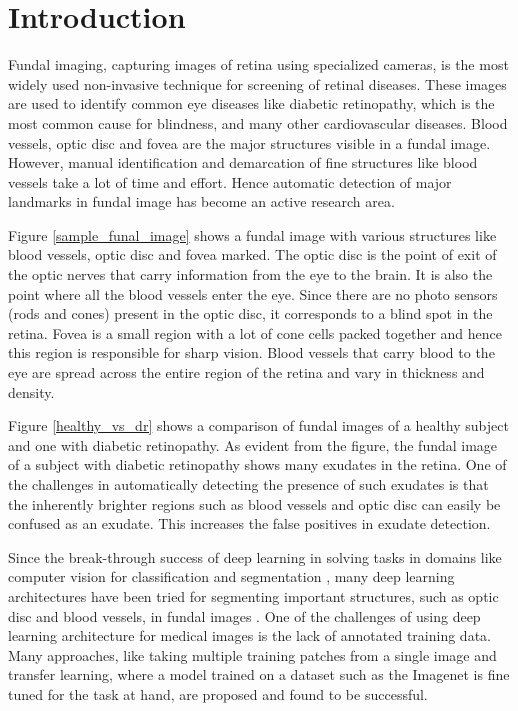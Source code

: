 \section{Introduction}
Fundal imaging, capturing images of retina using specialized cameras, is the most widely used non-invasive technique for screening of retinal diseases.
These images are used to identify common eye diseases like diabetic retinopathy, which is the most common cause for blindness, and many other cardiovascular diseases.
Blood vessels, optic disc and fovea are the major structures visible in a fundal image.
However, manual identification and demarcation of fine structures like blood vessels take a lot of time and effort.
Hence automatic detection of major landmarks in fundal image has become an active research area.

Figure \ref{sample_funal_image} shows a fundal image with various structures like blood vessels, optic disc and fovea marked.
The optic disc is the point of exit of the optic nerves that carry information from the eye to the brain.
It is also the point where all the blood vessels enter the eye.
Since there are no photo sensors (rods and cones) present in the optic disc, it corresponds to a blind spot in the retina.
Fovea is a small region with a lot of cone cells packed together and hence this region is responsible for sharp vision.
Blood vessels that carry blood to the eye are spread across the entire region of the retina and vary in thickness and density.

Figure \ref{healthy_vs_dr} shows a comparison of fundal images of a healthy subject and one with diabetic retinopathy.
As evident from the figure, the fundal image of a subject with diabetic retinopathy shows many exudates in the retina.
One of the challenges in automatically detecting the presence of such exudates is that the inherently  brighter regions such as blood vessels and optic disc can easily be confused as an exudate.
This increases the false positives in exudate detection.

Since the break-through success of deep learning in solving tasks in domains like computer vision for classification \cite{krizhevsky2012imagenet} \cite{simonyan2014very} \cite{he2016deep} and segmentation \cite{long2015fully} \cite{chen2017deeplab} \cite{wu2019fastfcn}, many deep learning architectures have been tried for segmenting important structures, such as optic disc and blood vessels, in fundal images \cite {vengalil2016customizing} \cite{zhuang2018laddernet} \cite{jiang2018retinal} \cite{park2020m}.
One of the challenges of using deep learning architecture for medical images is the lack of annotated training data.
Many approaches, like taking multiple training patches from  a single image \cite{vengalil2016customizing} and transfer learning, where a model trained on a dataset such as the Imagenet \cite{deng2009imagenet} is fine tuned for the task at hand, are proposed and found to be successful.


